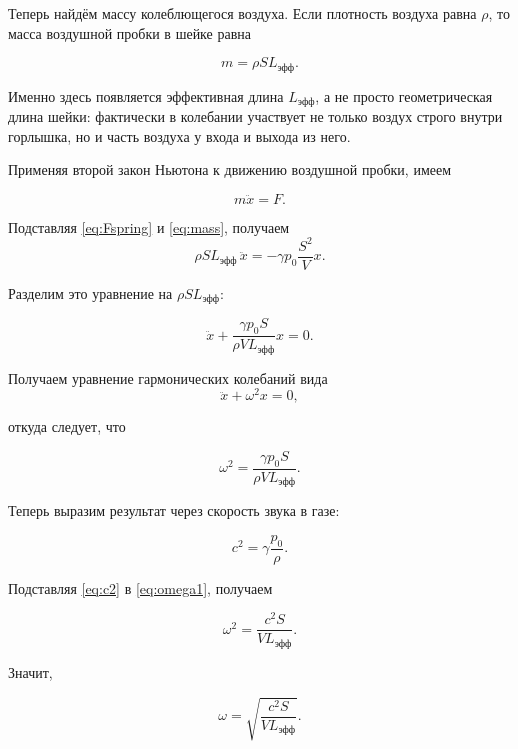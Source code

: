 \documentclass[12pt]{extreport}
\begin{document}
	Теперь найдём массу колеблющегося воздуха. Если плотность воздуха равна \(\rho\), то масса воздушной пробки в шейке равна
	
	
	\begin{equation}
		m=\rho S L_{\text{эфф}}.
		\label{eq:mass}
	\end{equation}
	
	
	Именно здесь появляется эффективная длина \(L_{\text{эфф}}\), а не просто геометрическая длина шейки: фактически в колебании участвует не только воздух строго внутри горлышка, но и часть воздуха у входа и выхода из него.
	
	
	Применяя второй закон Ньютона к движению воздушной пробки, имеем
	
	
	\begin{equation}
		m\ddot{x}=F.
	\end{equation}
	
	
	Подставляя \eqref{eq:Fspring} и \eqref{eq:mass}, получаем
	\[
	\rho S L_{\text{эфф}}\,\ddot{x}
	=
	-\gamma p_0\frac{S^2}{V}x.
	\]
	
	Разделим это уравнение на \(\rho S L_{\text{эфф}}\):
	
	
	\begin{equation}
		\ddot{x}
		+
		\frac{\gamma p_0 S}{\rho V L_{\text{эфф}}}x=0.
		\label{eq:motion2}
	\end{equation}
	
	Получаем уравнение гармонических колебаний вида
	\[
	\ddot{x}+\omega^2 x=0,
	\]
	
	
	откуда следует, что
	
	
	\begin{equation}
		\omega^2=\frac{\gamma p_0 S}{\rho V L_{\text{эфф}}}.
		\label{eq:omega1}
	\end{equation}
	
	
	Теперь выразим результат через скорость звука в газе:
	
	
	\begin{equation}
		c^2=\gamma\frac{p_0}{\rho}.
		\label{eq:c2}
	\end{equation}
	
	
	Подставляя \eqref{eq:c2} в \eqref{eq:omega1}, получаем
	
	
	\begin{equation}
		\omega^2=\frac{c^2S}{V L_{\text{эфф}}}.
		\label{eq:omega2}
	\end{equation}
	
	
	Значит,
	
	
	\begin{equation}
		\omega=\sqrt{\frac{c^2S}{V L_{\text{эфф}}}}.
	\end{equation}
	
\end{document}
